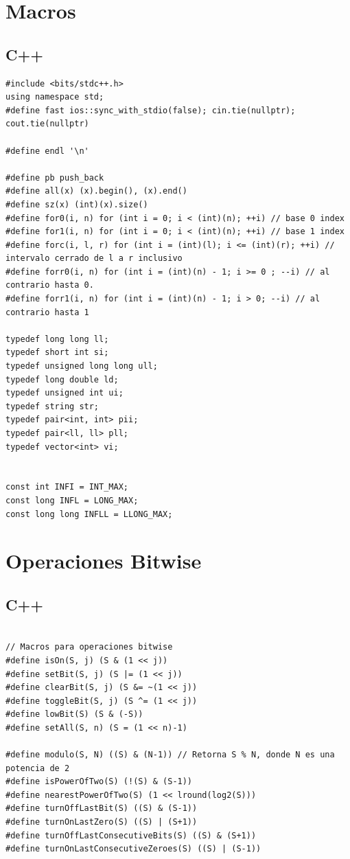 \documentclass{article}
\begin{document}
\section{Macros}

\subsection{C++}


\begin{lstlisting}[style=cppstyle]
#include <bits/stdc++.h>
using namespace std;
#define fast ios::sync_with_stdio(false); cin.tie(nullptr); cout.tie(nullptr)

#define endl '\n'

#define pb push_back
#define all(x) (x).begin(), (x).end()
#define sz(x) (int)(x).size()
#define for0(i, n) for (int i = 0; i < (int)(n); ++i) // base 0 index
#define for1(i, n) for (int i = 0; i < (int)(n); ++i) // base 1 index
#define forc(i, l, r) for (int i = (int)(l); i <= (int)(r); ++i) // intervalo cerrado de l a r inclusivo
#define forr0(i, n) for (int i = (int)(n) - 1; i >= 0 ; --i) // al contrario hasta 0.
#define forr1(i, n) for (int i = (int)(n) - 1; i > 0; --i) // al contrario hasta 1

typedef long long ll;
typedef short int si;
typedef unsigned long long ull;
typedef long double ld;
typedef unsigned int ui;
typedef string str;
typedef pair<int, int> pii;
typedef pair<ll, ll> pll;
typedef vector<int> vi;


const int INFI = INT_MAX;
const long INFL = LONG_MAX;
const long long INFLL = LLONG_MAX;

\end{lstlisting}


\section{Operaciones Bitwise}

\subsection{C++}

\begin{lstlisting}[style=cppstyle]

// Macros para operaciones bitwise
#define isOn(S, j) (S & (1 << j))
#define setBit(S, j) (S |= (1 << j))
#define clearBit(S, j) (S &= ~(1 << j))
#define toggleBit(S, j) (S ^= (1 << j))
#define lowBit(S) (S & (-S))
#define setAll(S, n) (S = (1 << n)-1)

#define modulo(S, N) ((S) & (N-1)) // Retorna S % N, donde N es una potencia de 2
#define isPowerOfTwo(S) (!(S) & (S-1))
#define nearestPowerOfTwo(S) (1 << lround(log2(S)))
#define turnOffLastBit(S) ((S) & (S-1))
#define turnOnLastZero(S) ((S) | (S+1))
#define turnOffLastConsecutiveBits(S) ((S) & (S+1))
#define turnOnLastConsecutiveZeroes(S) ((S) | (S-1))

\end{lstlisting}
\end{document}
